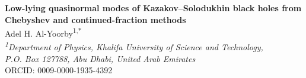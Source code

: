 \documentclass[12pt,a4paper]{article}
\begin{document}
\color{blue}
\ifdefined\markedrevision
  \linenumbers
\fi
\color{black}
\begin{center}
\color{blue}
{\Large\bfseries Low-lying quasinormal modes of Kazakov--Solodukhin black holes from Chebyshev and continued-fraction methods}\\
\color{black}
\vspace{1.2em}
{\normalsize Adel H. Al-Yoorby\textsuperscript{1,*}}\\
\vspace{0.25em}
{\itshape \textsuperscript{1}Department of Physics, Khalifa University of Science and Technology,}\\
{\itshape P.O. Box 127788, Abu Dhabi, United Arab Emirates}\\
\vspace{0.25em}
{\small ORCID: 0009-0000-1935-4392}
\end{center}
\end{document}

